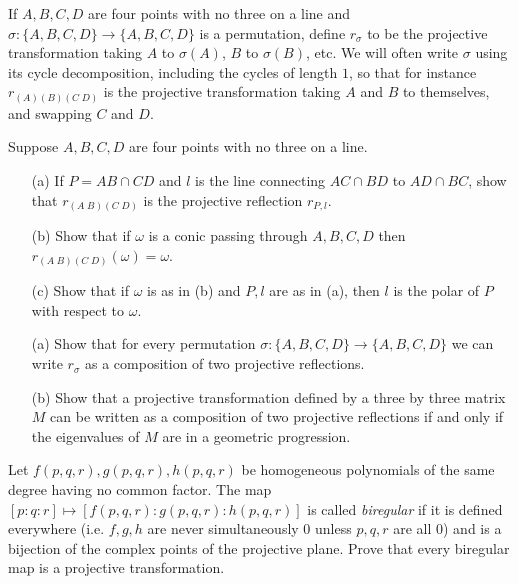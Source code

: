 \begin{defn} If $A,B,C,D$ are four points with no three on a line and $\sigma:\{A,B,C,D\} \rightarrow \{A,B,C,D\}$ is a permutation, define $r_{\sigma}$ to be the projective transformation taking $A$ to $\sigma(A)$, $B$ to $\sigma(B)$, etc. We will often write $\sigma$ using its cycle decomposition, including the cycles of length $1$, so that for instance $r_{(A)(B)(C\;D)}$ is the projective transformation taking $A$ and $B$ to themselves, and swapping $C$ and $D$.
\end{defn}

\begin{exer} Suppose $A,B,C,D$ are four points with no three on a line.
\begin{itemize}
\item[(a)] If $P = AB\cap CD$ and $l$ is the line connecting $AC\cap BD$ to $AD\cap BC$, show that $r_{(A\;B)(C\;D)}$ is the projective reflection $r_{P,l}$.

\item[(b)] Show that if $\omega$ is a conic passing through $A,B,C,D$ then $r_{(A\;B)(C\;D)}(\omega) = \omega$.

\item[(c)] Show that if $\omega$ is as in (b) and $P,l$ are as in (a), then $l$ is the polar of $P$ with respect to $\omega$.
\end{itemize}
\end{exer}

\begin{exer}
\begin{itemize}
\item[(a)] Show that for every permutation $\sigma:\{A,B,C,D\} \rightarrow \{A,B,C,D\}$ we can write $r_\sigma$ as a composition of two projective reflections.

\item[(b)] Show that a projective transformation defined by a three by three matrix $M$ can be written as a composition of two projective reflections if and only if the eigenvalues of $M$ are in a geometric progression. %
\end{itemize}
\end{exer}

\begin{exer} Let $f(p,q,r),g(p,q,r),h(p,q,r)$ be homogeneous polynomials of the same degree having no common factor. The map $[p:q:r]\mapsto [f(p,q,r):g(p,q,r):h(p,q,r)]$ is called \emph{biregular} if it is defined everywhere (i.e. $f,g,h$ are never simultaneously $0$ unless $p,q,r$ are all $0$) and is a bijection of the complex points of the projective plane. Prove that every biregular map is a projective transformation.
\end{exer}

